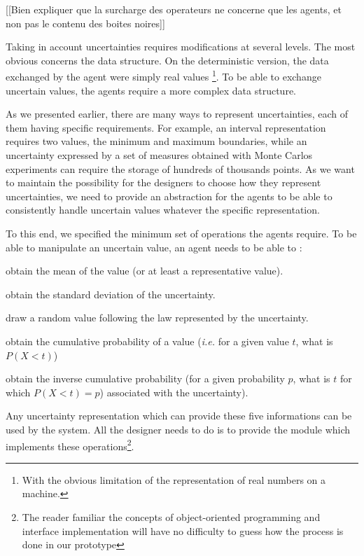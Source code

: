 [[Bien expliquer que la surcharge des operateurs ne concerne que les agents, et non pas le contenu des boites noires]]

Taking in account uncertainties requires modifications at several levels. The most obvious concerns the data structure. On the deterministic version, the data exchanged by the agent were simply real values \footnote{With the obvious limitation of the representation of real numbers on a machine.}. To be able to exchange uncertain values, the agents require a more complex data structure.

As we presented earlier, there are many ways to represent uncertainties, each of them having specific requirements. For example, an interval representation requires two values, the minimum and maximum boundaries, while an uncertainty expressed by a set of measures obtained with Monte Carlos experiments can require the storage of hundreds of thousands points. As we want to maintain the possibility for the designers to choose how they represent uncertainties, we need to provide an abstraction for the agents to be able to consistently handle uncertain values whatever the specific representation.

To this end, we specified the minimum set of operations the agents require. To be able to manipulate an uncertain value, an agent needs to be able to :
\begin{compactitem}
\item obtain the mean of the value (or at least a representative value).
\item obtain the standard deviation of the uncertainty.
\item draw a random value following the law represented by the uncertainty.
\item obtain the cumulative probability of a value (\emph{i.e.} for a given value $t$, what is $P(X < t)$) 
\item obtain the inverse cumulative probability (for a given probability $p$, what is $t$ for which $P(X < t) = p$) associated with the uncertainty).
\end{compactitem}

Any uncertainty representation which can provide these five informations can be used by the system. All the designer needs to do is to provide the module which implements these operations\footnote{The reader familiar the concepts of object-oriented programming and interface implementation will have no difficulty to guess how the process is done in our prototype}.

